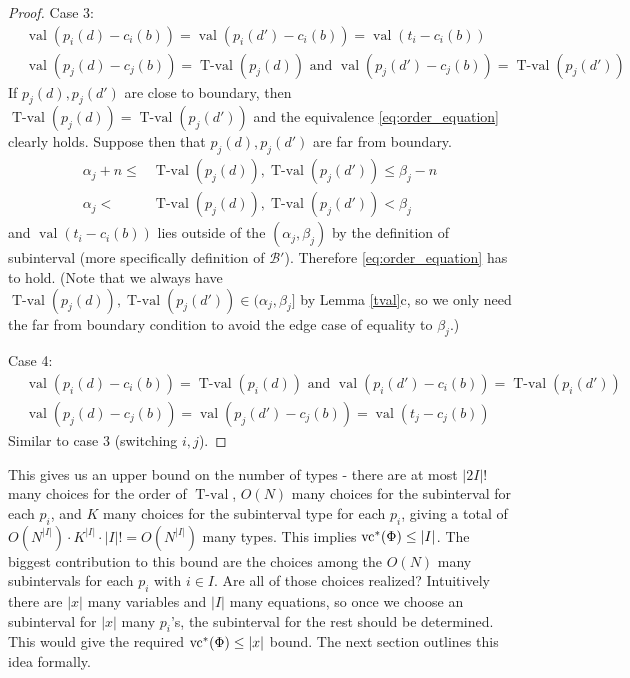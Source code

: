 \documentclass{amsart}
\newcommand{\BB}{\mathscr B}
\DeclareMathOperator{\vval}{val}
\DeclareMathOperator{\tval}{T-val}
\begin{document}
\begin{proof}
 Case 3:
  \begin{align*}
    &\vval (p_i(d) - c_i(b)) = \vval (p_i(d') - c_i(b)) = \vval(t_i - c_i(b)) \\
    &\vval (p_j(d) - c_j(b)) = \tval(p_j(d)) \text{ and } \vval (p_j(d') - c_j(b)) = \tval(p_j(d'))
  \end{align*}
  If $p_j(d), p_j(d')$ are close to boundary,
  then $\tval(p_j(d)) = \tval(p_j(d'))$ and the equivalence \eqref{eq:order_equation} clearly holds.
  Suppose then that $p_j(d), p_j(d')$ are far from boundary.
  \begin{align*}
    \alpha_j + n \leq &\tval(p_j(d)), \tval(p_j(d')) \leq \beta_j - n \\
    \alpha_j < &\tval(p_j(d)), \tval(p_j(d')) < \beta_j
  \end{align*}
  and $\vval(t_i - c_i(b))$ lies outside of the $(\alpha_j, \beta_j)$
  by the definition of subinterval (more specifically definition of $\BB'$).
  Therefore \eqref{eq:order_equation} has to hold.
  (Note that we always have $\tval(p_j(d)), \tval(p_j(d')) \in (\alpha_j, \beta_j]$ by Lemma \ref{tval}c, so 
  we only need the far from boundary condition to avoid the edge case of equality to $\beta_j$.)

  Case 4:
  \begin{align*}
    &\vval (p_i(d) - c_i(b)) = \tval(p_i(d)) \text{ and } \vval (p_i(d') - c_i(b)) = \tval(p_i(d')) \\
    &\vval (p_j(d) - c_j(b)) = \vval (p_j(d') - c_j(b)) = \vval(t_j - c_j(b))
  \end{align*}
  Similar to case 3 (switching $i,j$).
\end{proof}



\begin{Note}
  This gives us an upper bound on the number of types - there are at most $|2I|!$ many choices for the order of $\tval$,
  $O(N)$ many choices for the subinterval for each $p_i$,
  and $K$ many choices for the subinterval type for each $p_i$,
  giving a total of $O(N^{|I|}) \cdot K^{|I|} \cdot |I|! = O(N^{|I|})$ many types.
  This implies $\operatorname{vc}^*(\Phi) \leq |I|$.
  The biggest contribution to this bound are the choices among the $O(N)$ many subintervals for each $p_i$ with $i \in I$.
  Are all of those choices realized?
  Intuitively there are $|x|$ many variables and $|I|$ many equations,
  so once we choose an subinterval for $|x|$ many $p_i$'s, the subinterval for the rest should be determined.
  This would give the required $\operatorname{vc}^*(\Phi) \leq |x|$ bound.
  The next section outlines this idea formally.
\end{Note}
\end{document}
